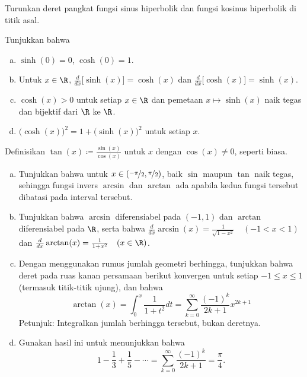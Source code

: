 \begin{exercise}
Turunkan deret pangkat fungsi sinus hiperbolik dan fungsi kosinus hiperbolik di titik asal.
\end{exercise}

\begin{exercise}
Tunjukkan bahwa
\begin{enumerate}[a)]
\item
$\sinh(0) = 0$, $\cosh(0) = 1$.
\item
Untuk $x \in \R$,
$\frac{d}{dx} \bigl[ \sinh(x) \bigr] = \cosh(x)$ dan
$\frac{d}{dx} \bigl[ \cosh(x) \bigr] = \sinh(x)$.
\item
$\cosh(x) > 0$ untuk setiap $x \in \R$ dan
pemetaan $x \mapsto \sinh(x)$ naik tegas dan bijektif dari $\R$ ke $\R$.
\item
${\bigl(\cosh(x)\bigr)}^2 = 1 + {\bigl(\sinh(x)\bigr)}^2$ untuk setiap
$x$.
\end{enumerate}
\end{exercise}

\begin{exercise}
Definisikan $\tan(x) \coloneqq \frac{\sin(x)}{\cos(x)}$ untuk $x$ dengan $\cos(x) \neq 0$, seperti biasa.
\begin{enumerate}[a)]
\item
Tunjukkan bahwa untuk $x \in (\nicefrac{-\pi}{2},\nicefrac{\pi}{2})$,
baik $\sin$ maupun $\tan$ naik tegas, sehingga
fungsi invers $\arcsin$
dan $\arctan$ ada apabila kedua fungsi tersebut dibatasi pada interval tersebut.
\item
Tunjukkan bahwa $\arcsin$ diferensiabel pada $(-1,1)$ dan $\arctan$
diferensiabel pada $\R$, serta bahwa
$\frac{d}{dx} \arcsin(x) = \frac{1}{\sqrt{1-x^2}} \quad (-1<x<1)$ dan
$\frac{d}{dx} \arctan(x) = \frac{1}{1+x^2} \quad (x \in \R)$.
\item
Dengan menggunakan rumus jumlah geometri berhingga, tunjukkan bahwa deret pada
ruas kanan persamaan berikut konvergen untuk setiap $-1 \leq x \leq 1$
(termasuk titik-titik ujung), dan bahwa
\begin{equation*}
\arctan(x) = \int_0^x \frac{1}{1+t^2} dt
=
\sum_{k=0}^\infty \frac{{(-1)}^k}{2k+1} x^{2k+1}
\end{equation*}
Petunjuk: Integralkan jumlah berhingga tersebut, bukan deretnya.
\item
Gunakan hasil ini untuk menunjukkan bahwa
\begin{equation*}
1 - \frac{1}{3} + \frac{1}{5} - \cdots
=
\sum_{k=0}^\infty \frac{{(-1)}^k}{2k+1}
=
\frac{\pi}{4} .
\end{equation*}
\end{enumerate}
\end{exercise}


